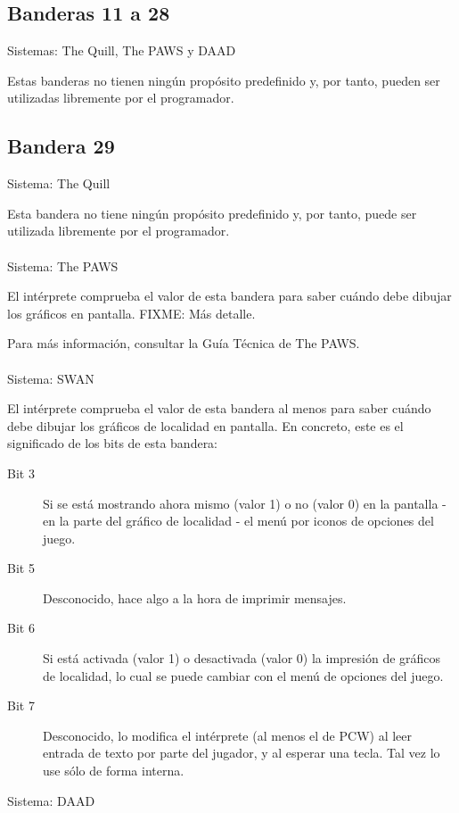 \documentclass[11pt, a5paper]{article}
\newcommand{\quill}{\textsf{The Quill}\xspace}
\newcommand{\paw}{\textsf{The PAWS}\xspace}
\newcommand{\swan}{\textsf{SWAN}\xspace}
\newcommand{\daad}{\textsf{DAAD}\xspace}
\newcommand{\sistema}[1]{\noindent Sistema: #1 \nopagebreak}
\newcommand{\sistemas}[1]{\noindent Sistemas: #1 \nopagebreak}
\begin{document}
\subsection{Banderas 11 a 28}

\sistemas{\quill, \paw y \daad}

Estas banderas no tienen ningún propósito predefinido y, por tanto, pueden ser utilizadas libremente por el programador.

\subsection{Bandera 29}\label{flag29}

\sistema{\quill}

Esta bandera no tiene ningún propósito predefinido y, por tanto, puede ser utilizada libremente por el programador.
\\\ \\
\sistema{\paw}

El intérprete comprueba el valor de esta bandera para saber cuándo debe dibujar los gráficos en pantalla. FIXME: Más detalle.

Para más información, consultar la Guía Técnica de \paw \cite{PawsZX}.
\\\ \\
\sistema{\swan}

El intérprete comprueba el valor de esta bandera al menos para saber cuándo debe dibujar los gráficos de localidad en pantalla. En concreto, este es el significado de los bits de esta bandera:

\begin{description}
  \item[Bit 3] Si se está mostrando ahora mismo (valor 1) o no (valor 0) en la pantalla - en la parte del gráfico de localidad - el menú por iconos de opciones del juego.
  \item[Bit 5] Desconocido, hace algo a la hora de imprimir mensajes.
  \item[Bit 6] Si está activada (valor 1) o desactivada (valor 0) la impresión de gráficos de localidad, lo cual se puede cambiar con el menú de opciones del juego.
  \item[Bit 7] Desconocido, lo modifica el intérprete (al menos el de PCW) al leer entrada de texto por parte del jugador, y al esperar una tecla. Tal vez lo use sólo de forma interna.
\end{description}

\sistema{\daad}
\end{document}
